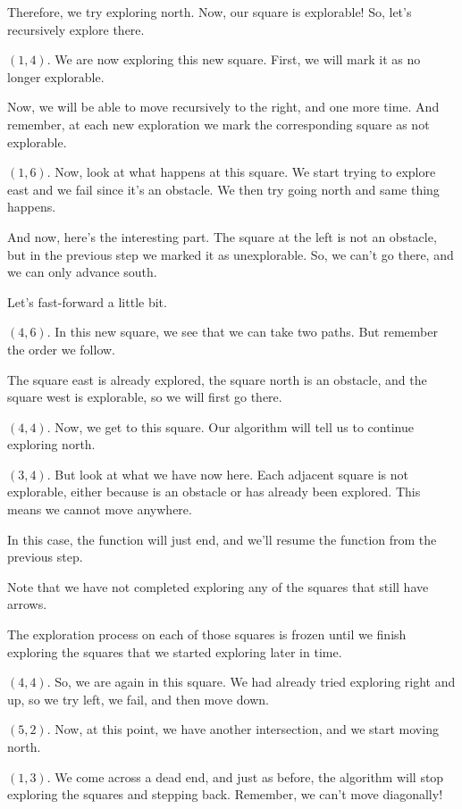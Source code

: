 \documentclass[12pt]{article}
\begin{document}
Therefore, we try exploring north. Now, our square is explorable!
So, let's recursively explore there.

$(1, 4)$. We are now exploring this new square.
First, we will mark it as no longer explorable.

Now, we will be able to move recursively to the right,
and one more time. And remember, at each new exploration we
mark the corresponding square as not explorable.

$(1, 6)$. Now, look at what happens at this square. We start
trying to explore east and we fail since it's an obstacle.
We then try going north and same thing happens.

And now, here's
the interesting part. The square at the left is not an obstacle,
but in the previous step we marked it as unexplorable. So,
we can't go there, and we can only advance south.

Let's fast-forward a little bit.

$(4, 6)$. In this new square, we see that we
can take two paths. But remember the order we follow.

The square east is already explored, the square north is an
obstacle, and the square west is explorable, so we will
first go there.

$(4, 4)$. Now, we get to this square. Our algorithm will tell
us to continue exploring north.

$(3, 4)$. But look at what we have now here. Each adjacent
square is not explorable, either because is an obstacle or
has already been explored. This means we cannot move anywhere.

In this case, the function will just end, and we'll resume
the function from the previous step.

Note that we have not completed exploring any of the squares
that still have arrows.

The exploration process on each of those squares is
frozen until we finish exploring the squares that we started
exploring later in time.

$(4, 4)$. So, we are again in this square. We had already tried
exploring right and up, so we try left, we fail, and then move
down.

$(5, 2)$. Now, at this point, we have another intersection,
and we start moving north.

$(1, 3)$. We come across a dead end, and just as before, the algorithm
will stop exploring the squares and stepping back.
Remember, we can't move diagonally!
\end{document}

